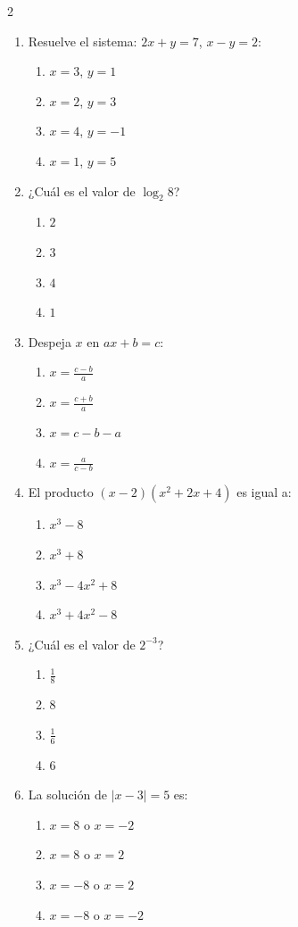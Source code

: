 \documentclass[10pt]{article}
\begin{document}
\begin{multicols}{2}
\begin{enumerate}
\item Resuelve el sistema: $2x + y = 7$, $x - y = 2$:
\begin{enumerate}[label=(\alph*)]
\item $x=3$, $y=1$
\item $x=2$, $y=3$
\item $x=4$, $y=-1$
\item $x=1$, $y=5$
\end{enumerate}

\item ¿Cuál es el valor de $\log_2 8$?
\begin{enumerate}[label=(\alph*)]
\item $2$
\item $3$
\item $4$
\item $1$
\end{enumerate}

\item Despeja $x$ en $a x + b = c$:
\begin{enumerate}[label=(\alph*)]
\item $x = \frac{c-b}{a}$
\item $x = \frac{c+b}{a}$
\item $x = c - b - a$
\item $x = \frac{a}{c-b}$
\end{enumerate}

\item El producto $(x-2)(x^2+2x+4)$ es igual a:
\begin{enumerate}[label=(\alph*)]
\item $x^3 - 8$
\item $x^3 + 8$
\item $x^3 - 4x^2 + 8$
\item $x^3 + 4x^2 - 8$
\end{enumerate}

\item ¿Cuál es el valor de $2^{-3}$?
\begin{enumerate}[label=(\alph*)]
\item $\frac{1}{8}$
\item $8$
\item $\frac{1}{6}$
\item $6$
\end{enumerate}

\item La solución de $|x-3| = 5$ es:
\begin{enumerate}[label=(\alph*)]
\item $x = 8$ o $x = -2$
\item $x = 8$ o $x = 2$
\item $x = -8$ o $x = 2$
\item $x = -8$ o $x = -2$
\end{enumerate}


\end{enumerate}
\end{multicols}
\end{document}

